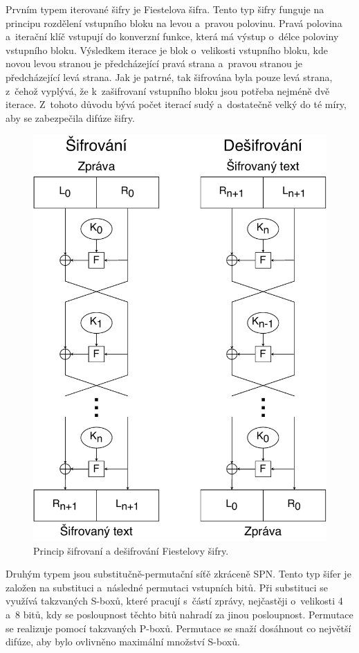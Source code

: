 Prvním typem iterované šifry je Fiestelova šifra. Tento typ šifry funguje na principu rozdělení vstupního bloku na levou a~pravou polovinu. Pravá polovina a~iterační klíč vstupují do konverzní funkce, která má výstup o~délce poloviny vstupního bloku. Výsledkem iterace je blok o~velikosti vstupního bloku, kde novou levou stranou je předcházející pravá strana a~pravou stranou je předcházející levá strana. Jak je patrné, tak šifrována byla pouze levá strana, z~čehož vyplývá, že k~zašifrovaní vstupního bloku jsou potřeba nejméně dvě iterace. Z~tohoto důvodu bývá počet iterací sudý a~dostatečně velký do té míry, aby se zabezpečila difúze šifry.\cite{Burda9788021446120ISBN}
\newpage
\begin{figure}[!h]
  \begin{center}
    \includegraphics[scale=0.5]{obrazky/feistelCipher.pdf}
  \end{center}
  \caption[Fiestelova šifr]{Princip šifrovaní a dešifrování Fiestelovy šifry.\cite{FeistelCipher}}
  \label{img:FeistelCipher}
\end{figure}
Druhým typem jsou substitučně-permutační síťě zkráceně SPN. Tento typ šifer je založen na substituci a~následné permutaci vstupních bitů. Při substituci se využívá takzvaných S-boxů, které pracují s~částí zprávy, nejčastěji o~velikosti 4 a~8 bitů, kdy se posloupnost těchto bitů nahradí za jinou posloupnost. Permutace se realizuje pomocí takzvaných P-boxů. Permutace se snaží dosáhnout co největší difúze, aby bylo ovlivněno maximální množství S-boxů.%

